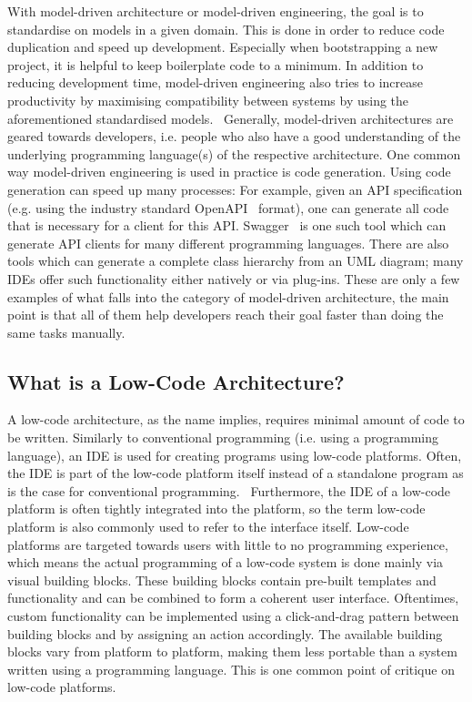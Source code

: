 \documentclass[runningheads]{llncs}
\begin{document}
With model-driven architecture or model-driven engineering, the goal is to standardise on models in a given domain. This is done in order to reduce code duplication and speed up development. Especially when bootstrapping a new project, it is helpful to keep boilerplate code to a minimum. In addition to reducing development time, model-driven engineering also tries to increase productivity by maximising compatibility between systems by using the aforementioned standardised models.~\cite{wiki:model_driven_engineering} Generally, model-driven architectures are geared towards developers, i.e. people who also have a good understanding of the underlying programming language(s) of the respective architecture. One common way model-driven engineering is used in practice is code generation. Using code generation can speed up many processes: For example, given an API specification (e.g. using the industry standard OpenAPI~\cite{openapis} format), one can generate all code that is necessary for a client for this API. Swagger~\cite{swagger} is one such tool which can generate API clients for many different programming languages. There are also tools which can generate a complete class hierarchy from an UML diagram; many IDEs offer such functionality either natively or via plug-ins. These are only a few examples of what falls into the category of model-driven architecture, the main point is that all of them help developers reach their goal faster than doing the same tasks manually.

\subsection{What is a Low-Code Architecture?}
\label{ssec:what_is_a_low_code_platform}

A low-code architecture, as the name implies, requires minimal amount of code to be written. Similarly to conventional programming (i.e. using a programming language), an IDE is used for creating programs using low-code platforms. Often, the IDE is part of the low-code platform itself instead of a standalone program as is the case for conventional programming.~\cite{wiki:low_code_development_platform} Furthermore, the IDE of a low-code platform is often tightly integrated into the platform, so the term low-code platform is also commonly used to refer to the interface itself. Low-code platforms are targeted towards users with little to no programming experience, which means the actual programming of a low-code system is done mainly via visual building blocks. These building blocks contain pre-built templates and functionality and can be combined to form a coherent user interface. Oftentimes, custom functionality can be implemented using a click-and-drag pattern between building blocks and by assigning an action accordingly. The available building blocks vary from platform to platform, making them less portable than a system written using a programming language. This is one common point of critique on low-code platforms.~\cite{low_code_platforms_deliver_customer_facing_apps_but_will_they_scale_up, low_code_patforms_dont_buy_the_hype, the_benefits_of_implementing_low_code_development_platforms}
\end{document}
